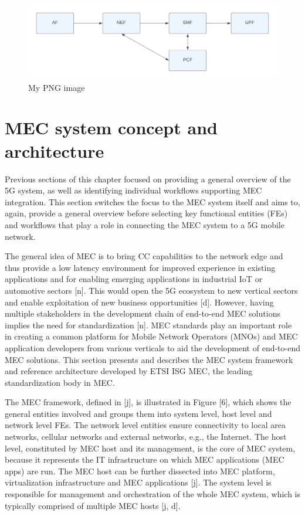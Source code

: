 \documentclass[12pt,a4paper,twoside]{report}
\begin{document}
\begin{figure}[ht]
	\centering
	\includegraphics[width=15cm]{./images/traffic-control.png}
	\caption{My PNG image}
\end{figure}

\section{MEC system concept and architecture}
Previous sections of this chapter focused on providing a general overview of the 5G system, as well as identifying individual workflows supporting MEC integration. This section switches the focus to the MEC system itself and aims to, again, provide a general overview before selecting key functional entities (FEs) and workflows that play a role in connecting the MEC system to a 5G mobile network. 

The general idea of MEC is to bring CC capabilities to the network edge and thus provide a low latency environment for improved experience in existing applications and for enabling emerging applications in industrial IoT or automotive sectors [n]. This would open the 5G ecosystem to new vertical sectors and enable exploitation of new business opportunities [d]. However, having multiple stakeholders in the development chain of end-to-end MEC solutions implies the need for standardization [n]. MEC standards play an important role in creating a common platform for Mobile Network Operators (MNOs) and MEC application developers from various verticals to aid the development of end-to-end MEC solutions. This section presents and describes the MEC system framework and reference architecture developed by ETSI ISG MEC, the leading standardization body in MEC. 

The MEC framework, defined in [j], is illustrated in Figure [6], which shows the general entities involved and groups them into system level, host level and network level FEs. The network level entities ensure connectivity to local area networks, cellular networks and external networks, e.g., the Internet. The host level, constituted by MEC host and its management, is the core of MEC system, because it represents the IT infrastructure on which MEC applications (MEC apps) are run. The MEC host can be further dissected into MEC platform, virtualization infrastructure and MEC applications [j]. The system level is responsible for management and orchestration of the whole MEC system, which is typically comprised of multiple MEC hosts [j, d].
\end{document}
